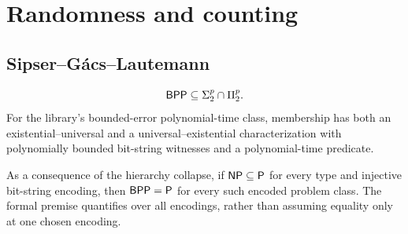 \section{Randomness and counting}

\begin{result}
\subsection{Sipser--G\'acs--Lautemann}
\[
\mathsf{BPP}\subseteq\Sigma^p_2\cap\Pi^p_2.
\]
For the library's bounded-error polynomial-time class, membership has both an
existential--universal and a universal--existential characterization with
polynomially bounded bit-string witnesses and a polynomial-time predicate.
\citep{Sipser1983,Lautemann1983}
\end{result}

\begin{result}
As a consequence of the hierarchy collapse, if $\mathsf{NP}\subseteq\mathsf{P}$ for
every type and injective bit-string encoding, then $\mathsf{BPP}=\mathsf{P}$ for every
such encoded problem class. The formal premise quantifies over all encodings,
rather than assuming equality only at one chosen encoding.\citep{AroraBarak09}
\end{result}

